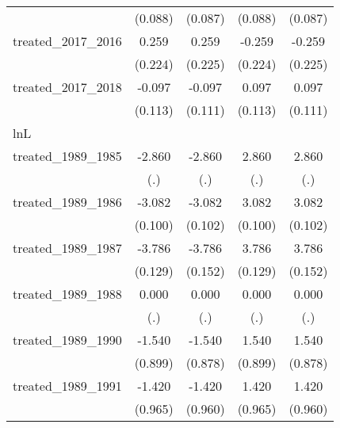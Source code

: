 {\begin{tabular}{l*{4}{c}}
            &     (0.088)         &     (0.087)         &     (0.088)         &     (0.087)         \\
[1em]
treated\_2017\_2016&       0.259         &       0.259         &      -0.259         &      -0.259         \\
            &     (0.224)         &     (0.225)         &     (0.224)         &     (0.225)         \\
[1em]
treated\_2017\_2018&      -0.097         &      -0.097         &       0.097         &       0.097         \\
            &     (0.113)         &     (0.111)         &     (0.113)         &     (0.111)         \\
\hline
lnL         &                     &                     &                     &                     \\
treated\_1989\_1985&      -2.860         &      -2.860         &       2.860         &       2.860         \\
            &         (.)         &         (.)         &         (.)         &         (.)         \\
[1em]
treated\_1989\_1986&      -3.082\sym{***}&      -3.082\sym{***}&       3.082\sym{***}&       3.082\sym{***}\\
            &     (0.100)         &     (0.102)         &     (0.100)         &     (0.102)         \\
[1em]
treated\_1989\_1987&      -3.786\sym{***}&      -3.786\sym{***}&       3.786\sym{***}&       3.786\sym{***}\\
            &     (0.129)         &     (0.152)         &     (0.129)         &     (0.152)         \\
[1em]
treated\_1989\_1988&       0.000         &       0.000         &       0.000         &       0.000         \\
            &         (.)         &         (.)         &         (.)         &         (.)         \\
[1em]
treated\_1989\_1990&      -1.540         &      -1.540         &       1.540         &       1.540         \\
            &     (0.899)         &     (0.878)         &     (0.899)         &     (0.878)         \\
[1em]
treated\_1989\_1991&      -1.420         &      -1.420         &       1.420         &       1.420         \\
            &     (0.965)         &     (0.960)         &     (0.965)         &     (0.960)         \\

\end{tabular}}
